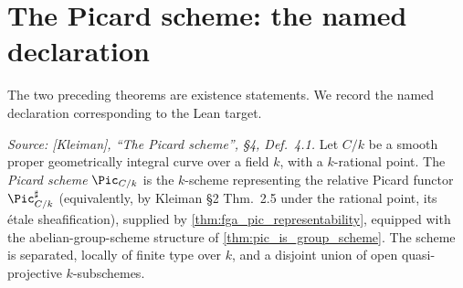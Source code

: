 \section{The Picard scheme: the named declaration}
\label{sec:fga_pic_named_definition}

The two preceding theorems are existence statements. We record the
named declaration corresponding to the Lean target.

\begin{definition}
  \label{def:pic_scheme}

  \textit{Source: [Kleiman], ``The Picard scheme'', \S 4, Def.~4.1.}
  Let \(C/k\) be a smooth proper geometrically integral curve over a field
  \(k\), with a \(k\)-rational point. The \emph{Picard scheme} \(\Pic_{C/k}\)
  is the \(k\)-scheme representing the relative Picard functor
  \(\Pic^\sharp_{C/k}\) (equivalently, by Kleiman \S 2 Thm.~2.5 under the
  rational point, its \'etale sheafification), supplied by
  \cref{thm:fga_pic_representability}, equipped with the abelian-group-scheme
  structure of \cref{thm:pic_is_group_scheme}. The scheme is separated,
  locally of finite type over \(k\), and a disjoint union of open
  quasi-projective \(k\)-subschemes.
\end{definition}

